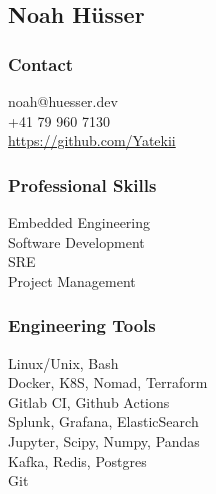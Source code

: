 \begin{facts}
    \section{Noah Hüsser}
    \sectionsep
    
    \subsubsection{Contact}
    noah@huesser.dev\\
    +41 79 960 7130\\
    \href{https://github.com/Yatekii}{https://github.com/Yatekii}\par
    \sectionsep
    
    \subsubsection{Professional Skills}
    Embedded Engineering\\
    Software Development\\
    SRE\\
    Project Management
    \sectionsep

    \subsubsection{Engineering Tools}
    Linux/Unix, Bash\\
    Docker, K8S, Nomad, Terraform\\
    Gitlab CI, Github Actions\\
    Splunk, Grafana, ElasticSearch\\
    Jupyter, Scipy, Numpy, Pandas\\
    Kafka, Redis, Postgres\\
    Git
    \sectionsep


\end{facts}
